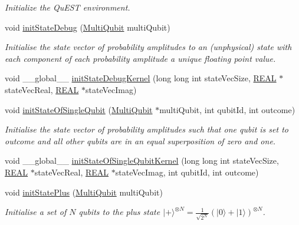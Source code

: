 \begin{DoxyCompactItemize}
\begin{DoxyCompactList}\small\item\em Initialize the Qu\+E\+ST environment. \end{DoxyCompactList}\item 
void \mbox{\hyperlink{QuEST__env__localGPU_8cu_a4b737ff9b4267609ef27e6cb4c42dc68}{init\+State\+Debug}} (\mbox{\hyperlink{structMultiQubit}{Multi\+Qubit}} multi\+Qubit)
\begin{DoxyCompactList}\small\item\em Initialise the state vector of probability amplitudes to an (unphysical) state with each component of each probability amplitude a unique floating point value. \end{DoxyCompactList}\item 
void \+\_\+\+\_\+global\+\_\+\+\_\+ \mbox{\hyperlink{QuEST__env__localGPU_8cu_a2f83bb3e7c5408d3a19161e9f0be6e35}{init\+State\+Debug\+Kernel}} (long long int state\+Vec\+Size, \mbox{\hyperlink{QuEST__precision_8h_a4b654506f18b8bfd61ad2a29a7e38c25}{R\+E\+AL}} $\ast$state\+Vec\+Real, \mbox{\hyperlink{QuEST__precision_8h_a4b654506f18b8bfd61ad2a29a7e38c25}{R\+E\+AL}} $\ast$state\+Vec\+Imag)
\item 
void \mbox{\hyperlink{QuEST__env__localGPU_8cu_a7169fd0442cbc3418f3fac4d13363ca2}{init\+State\+Of\+Single\+Qubit}} (\mbox{\hyperlink{structMultiQubit}{Multi\+Qubit}} $\ast$multi\+Qubit, int qubit\+Id, int outcome)
\begin{DoxyCompactList}\small\item\em Initialise the state vector of probability amplitudes such that one qubit is set to \textquotesingle{}outcome\textquotesingle{} and all other qubits are in an equal superposition of zero and one. \end{DoxyCompactList}\item 
void \+\_\+\+\_\+global\+\_\+\+\_\+ \mbox{\hyperlink{QuEST__env__localGPU_8cu_a1eb51dd82f1cbbef94d3cb7d2ca73e28}{init\+State\+Of\+Single\+Qubit\+Kernel}} (long long int state\+Vec\+Size, \mbox{\hyperlink{QuEST__precision_8h_a4b654506f18b8bfd61ad2a29a7e38c25}{R\+E\+AL}} $\ast$state\+Vec\+Real, \mbox{\hyperlink{QuEST__precision_8h_a4b654506f18b8bfd61ad2a29a7e38c25}{R\+E\+AL}} $\ast$state\+Vec\+Imag, int qubit\+Id, int outcome)
\item 
void \mbox{\hyperlink{QuEST__env__localGPU_8cu_af8a0082e2f695145bbfbb572e4c2e4f1}{init\+State\+Plus}} (\mbox{\hyperlink{structMultiQubit}{Multi\+Qubit}} multi\+Qubit)
\begin{DoxyCompactList}\small\item\em Initialise a set of $ N $ qubits to the plus state $ {| + \rangle}^{\otimes N} = \frac{1}{\sqrt{2^N}} (| 0 \rangle + | 1 \rangle)^{\otimes N} $. \end{DoxyCompactList}\item 

\end{DoxyCompactItemize}

